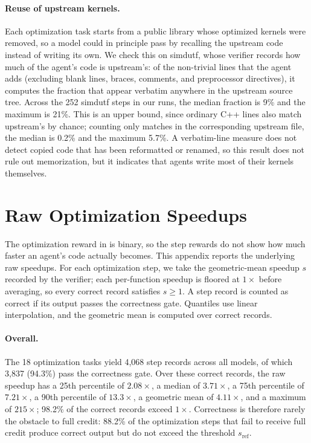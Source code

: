 \documentclass{article}
\begin{document}
\paragraph{Reuse of upstream kernels.}
Each optimization task starts from a public library whose optimized kernels
were removed, so a model could in principle pass by recalling the upstream code
instead of writing its own. We check this on simdutf, whose verifier records
how much of the agent's code is upstream's: of the non-trivial lines that the
agent adds (excluding blank lines, braces, comments, and preprocessor
directives), it computes the fraction that appear verbatim anywhere in the
upstream source tree. Across the 252 simdutf steps in our runs, the median
fraction is 9\% and the maximum is 21\%. This is an upper bound, since ordinary
C++ lines also match upstream's by chance; counting only matches in the
corresponding upstream file, the median is 0.2\% and the maximum 5.7\%. A
verbatim-line measure does not detect copied code that has been reformatted or
renamed, so this result does not rule out memorization, but it indicates that
agents write most of their kernels themselves.

\section{Raw Optimization Speedups}
\label{app:speedups}

The optimization reward in  is binary, so the step rewards
do not show how much faster an agent's code actually becomes. This appendix
reports the underlying raw speedups. For each optimization step, we take the
geometric-mean speedup $s$ recorded by the verifier; each per-function speedup
is floored at $1\times$ before averaging, so every correct record satisfies
$s \ge 1$. A step record is counted as correct if its output passes the
correctness gate. Quantiles use linear interpolation, and the geometric mean
is computed over correct records.

\paragraph{Overall.}
The 18 optimization tasks yield 4,068 step records across all models, of which
3,837 (94.3\%) pass the correctness gate. Over these correct records, the raw
speedup has a 25th percentile of $2.08\times$, a median of $3.71\times$, a 75th
percentile of $7.21\times$, a 90th percentile of $13.3\times$, a geometric mean
of $4.11\times$, and a maximum of $215\times$; 98.2\% of the correct records
exceed $1\times$. Correctness is therefore rarely the obstacle to full credit:
88.2\% of the optimization steps that fail to receive full credit produce
correct output but do not exceed the threshold $s_{\mathrm{ref}}$.
\end{document}
